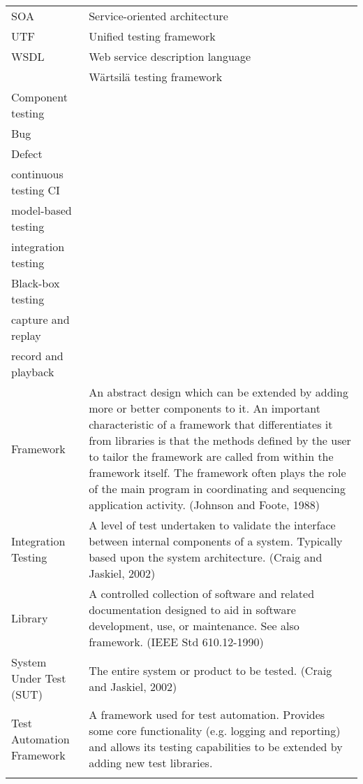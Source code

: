 \documentclass[12pt,a4paper,oneside,pdftex]{report}
\begin{document}
\noindent
\begin{longtable}{@{}p{}p{}@{}}
SOA & Service-oriented architecture \\
UTF & Unified testing framework \\
WSDL & Web service description language \\
\begin{comment}
WTF & Wärtsilä testing framework \\
Component testing & \\
Bug & \\
Defect & \\
continuous testing CI \\
model-based testing \\
integration testing \\
Black-box testing & \\
capture and replay & \\
record and playback & \\
Framework & An abstract design which can be extended by adding more or better components to it. An important characteristic of a framework that differentiates it from libraries is that the methods defined by the user to tailor the framework are called from within the framework itself. The framework often plays the role of the main program in coordinating and sequencing application activity. (Johnson and Foote, 1988) \\
Integration Testing & A level of test undertaken to validate the interface between internal components of a system. Typically based upon the system architecture. (Craig and Jaskiel, 2002) \\
Library & A controlled collection of software and related documentation designed to aid in software development, use, or maintenance. See also framework. (IEEE Std 610.12-1990) \\
System Under Test (SUT) & The entire system or product to be tested. (Craig and Jaskiel, 2002) \\
Test Automation Framework & A framework used for test automation. Provides some core functionality (e.g. logging and reporting) and allows its testing capabilities to be extended by adding new test libraries. \\

\end{comment}
\end{longtable}
\end{document}
